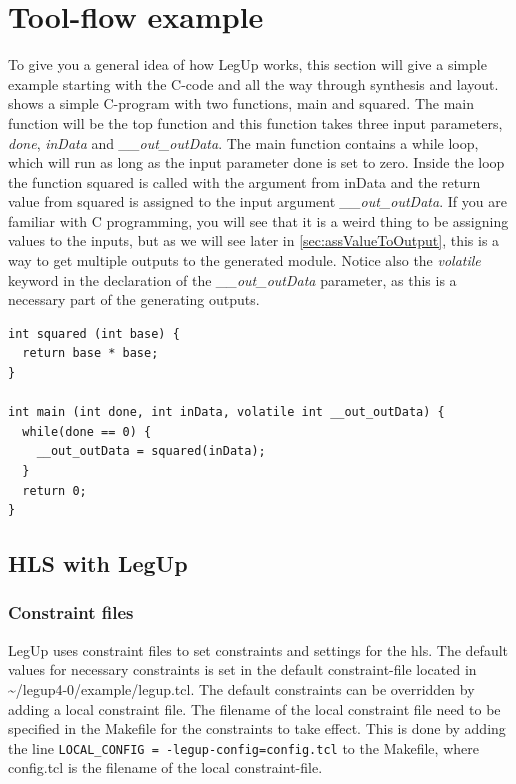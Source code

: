 \chapter{Tool-flow example}
To give you a general idea of how LegUp works, this section will give a simple example starting with the C-code and all the way through synthesis and layout.  shows a simple C-program with two functions, main and squared. The main function will be the top function and this function takes three input parameters, \textit{done}, \textit{inData} and \textit{\_\_out\_outData}. The main function contains a while loop, which will run as long as the input parameter done is set to zero. Inside the loop the function squared is called with the argument from inData and the return value from squared is assigned to the input argument \textit{\_\_out\_outData}. If you are familiar with C programming, you will see that it is a weird thing to be assigning values to the inputs, but as we will see later in \cref{sec:assValueToOutput}, this is a way to get multiple outputs to the generated module. Notice also the \textit{volatile} keyword in the declaration of the \textit{\_\_out\_outData} parameter, as this is a necessary part of the generating outputs.
\lstset{language=C++,style=Cstyle}
\begin{lstlisting}[caption={Simple C-code example},label=lst:ccodelisting]
int squared (int base) {
  return base * base;
}

int main (int done, int inData, volatile int __out_outData) {
  while(done == 0) {
    __out_outData = squared(inData);
  }
  return 0;
}
\end{lstlisting}

\section{HLS with LegUp}

\subsection{Constraint files}
LegUp uses constraint files to set constraints and settings for the \gls{hls}. The default values for necessary constraints is set in the default constraint-file located in \textasciitilde/legup4-0/example/legup.tcl. The default constraints can be overridden by adding a local constraint file. The filename of the local constraint file need to be specified in the Makefile for the constraints to take effect. This is done by adding the line \verb!LOCAL_CONFIG = -legup-config=config.tcl! to the Makefile, where config.tcl is the filename of the local constraint-file. 
